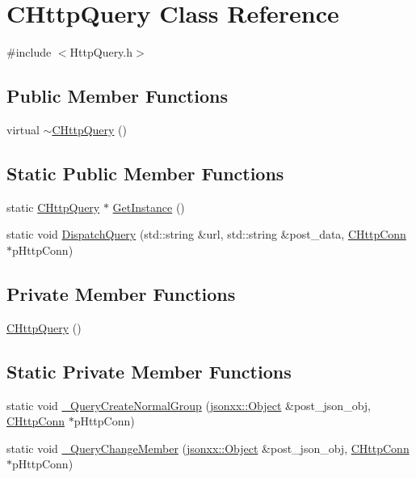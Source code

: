 \hypertarget{class_c_http_query}{}\section{C\+Http\+Query Class Reference}
\label{class_c_http_query}


{\ttfamily \#include $<$Http\+Query.\+h$>$}

\subsection*{Public Member Functions}
\begin{DoxyCompactItemize}
\item 
virtual \hyperlink{class_c_http_query_a2bb574b4a8d716e2fab3ce7d460d182f}{$\sim$\+C\+Http\+Query} ()
\end{DoxyCompactItemize}
\subsection*{Static Public Member Functions}
\begin{DoxyCompactItemize}
\item 
static \hyperlink{class_c_http_query}{C\+Http\+Query} $\ast$ \hyperlink{class_c_http_query_a97df39ff88a2c421b6722d3a8c56a1a9}{Get\+Instance} ()
\item 
static void \hyperlink{class_c_http_query_ad0b1d846811ecf1eb64da81fc13b3287}{Dispatch\+Query} (std\+::string \&url, std\+::string \&post\+\_\+data, \hyperlink{class_c_http_conn}{C\+Http\+Conn} $\ast$p\+Http\+Conn)
\end{DoxyCompactItemize}
\subsection*{Private Member Functions}
\begin{DoxyCompactItemize}
\item 
\hyperlink{class_c_http_query_a70983a4268a9f249825a1a3322938485}{C\+Http\+Query} ()
\end{DoxyCompactItemize}
\subsection*{Static Private Member Functions}
\begin{DoxyCompactItemize}
\item 
static void \hyperlink{class_c_http_query_a258f1156578be58ea22fc805e52eee7d}{\+\_\+\+Query\+Create\+Normal\+Group} (\hyperlink{classjsonxx_1_1_object}{jsonxx\+::\+Object} \&post\+\_\+json\+\_\+obj, \hyperlink{class_c_http_conn}{C\+Http\+Conn} $\ast$p\+Http\+Conn)
\item 
static void \hyperlink{class_c_http_query_adbb3291f507245eed85cc3ccff0360bd}{\+\_\+\+Query\+Change\+Member} (\hyperlink{classjsonxx_1_1_object}{jsonxx\+::\+Object} \&post\+\_\+json\+\_\+obj, \hyperlink{class_c_http_conn}{C\+Http\+Conn} $\ast$p\+Http\+Conn)
\end{DoxyCompactItemize}
